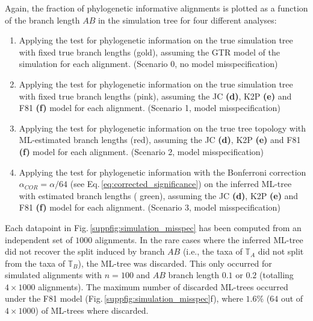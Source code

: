 \begin{appendices}
\medskip
Again, the fraction of phylogenetic informative alignments is plotted as a function of the branch length $AB$ in the simulation tree for four different analyses:

\medskip

\begin{enumerate}
\item  Applying the test for phylogenetic information on the true simulation tree with fixed true branch lengths ({\color{truetreeNoMisspecification}gold}), assuming the GTR model of the simulation for each alignment. (Scenario 0, no model misspecification)
\item Applying the test for phylogenetic information on the true simulation tree with fixed true branch lengths ({\color{truetree}pink}), assuming the JC \textbf{(d)}, K2P \textbf{(e)} and F81 \textbf{(f)} model for each alignment. (Scenario 1, model misspecification)
\item Applying the test for phylogenetic information on the true tree topology with ML-estimated branch lengths ({\color{truetreeML}red}), assuming the JC \textbf{(d)}, K2P \textbf{(e)} and F81 \textbf{(f)} model for each alignment. (Scenario 2, model misspecification)
\item Applying the test for phylogenetic information with the  Bonferroni correction $\alpha_{COR} = \alpha/64$ (see Eq.\,\eqref{eq:corrected_significance}) on the inferred ML-tree with estimated branch lengths ({\color{MLtreeBonferroni} green}), assuming the JC \textbf{(d)}, K2P \textbf{(e)} and F81 \textbf{(f)}  model for each alignment. (Scenario 3, model misspecification) 
\end{enumerate}

\medskip

Each datapoint in Fig.\,\ref{suppfig:simulation_misspec} has been computed from an independent set of $1000$ alignments.  In the rare cases where the inferred ML-tree did not recover the split induced by branch $AB$ (i.e., the taxa of $\mathbb{T}_A$ did not split from the taxa
of $\mathbb{T}_B$), the ML-tree was discarded. This only occurred for simulated alignments with $n = 100$ and $AB$ branch length $0.1$ or $0.2$ (totalling $4\times1000$ alignments). The maximum number of discarded ML-trees occurred under the F81 model (Fig.\,\ref{suppfig:simulation_misspec}f), where $1.6\%$ ($64$ out of $4\times1000$) of ML-trees where discarded.



%


\end{appendices}
